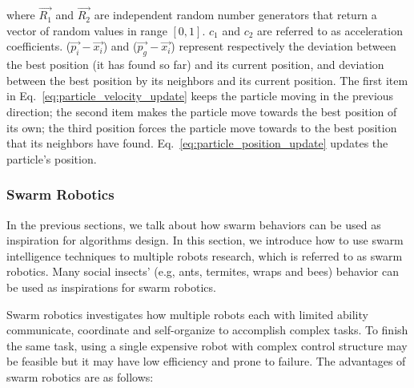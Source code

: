 where $\overrightarrow{R_{1}}$ and $\overrightarrow{R_{2}}$ are independent random number generators that return a vector of random values in range $[0, 1]$. $c_1$ and $c_2$ are referred to as acceleration coefficients. 
($\overrightarrow{p_{i}} - \overrightarrow{x_{i}}$) and ($\overrightarrow{p_{g}} - \overrightarrow{x_{i}}$) represent respectively the deviation between the best position (it has found so far) and its current position,  and deviation between the best position by its neighbors and its current position. The first item in Eq.~\eqref{eq:particle_velocity_update} keeps the particle moving in the previous direction; the second item makes the particle move towards the best position of its own; the third position forces the particle move towards to the best position that its neighbors have found. Eq.~\eqref{eq:particle_position_update} updates the particle's position.  
 
\subsubsection{Swarm Robotics}

In the previous sections, we talk about how swarm behaviors can be used as inspiration for algorithms design. In this section, we introduce how to use swarm intelligence techniques to multiple robots research, which is referred to as swarm robotics. Many social insects' (e.g, ants, termites, wraps and bees) behavior can be used as inspirations for swarm robotics. 

Swarm robotics investigates how multiple robots each with limited ability communicate, coordinate and self-organize to accomplish complex tasks. To finish the same task, using a single expensive robot with complex control structure may be feasible but it may have low efficiency and prone to failure. The advantages of swarm robotics are as follows: 

